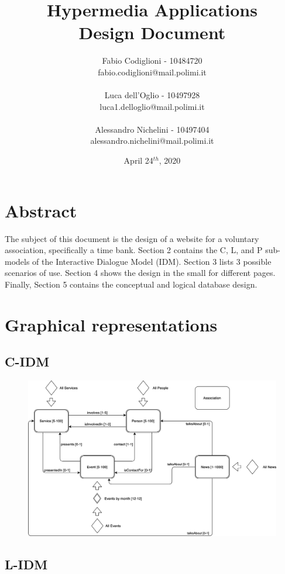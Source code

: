 \documentclass[a4paper, 11pt, parskip=half, headsepline]{scrreprt}
\title{Hypermedia Applications\\Design Document}
\author{Fabio Codiglioni - 10484720\\fabio.codiglioni@mail.polimi.it\\\\Luca dell'Oglio - 10497928\\luca1.delloglio@mail.polimi.it\\\\Alessandro Nichelini - 10497404\\alessandro.nichelini@mail.polimi.it}
\date{April 24$^{th}$, 2020}
\begin{document}
\maketitle
\tableofcontents
\newpage
{}


\chapter{Abstract}
The subject of this document is the design of a website for a voluntary association, specifically a time bank. Section 2 contains the C, L, and P sub-models of the Interactive Dialogue Model (IDM). Section 3 lists 3 possible scenarios of use. Section 4 shows the design in the small for different pages. Finally, Section 5 contains the conceptual and logical database design.

\chapter{Graphical representations}

\section{C-IDM}

\begin{figure}[H]
    \centering
    \includegraphics[width=0.85\linewidth, keepaspectratio]{IDM/C-IDM}
\end{figure}

\newpage
\section{L-IDM}
\end{document}
